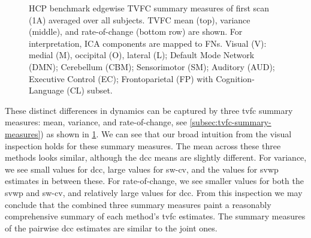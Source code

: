 \begin{figure}[t]
  \caption{
    HCP benchmark edgewise TVFC summary measures of first scan (1A) averaged over all subjects.
    TVFC mean (top), variance (middle), and rate-of-change (bottom row) are shown.
    For interpretation, ICA components are mapped to FNs.
    Visual (V): medial (M), occipital (O), lateral (L); Default Mode Network (DMN); Cerebellum (CBM); Sensorimotor (SM); Auditory (AUD); Executive Control (EC); Frontoparietal (FP) with Cognition-Language (CL) subset.
  }
  \label{fig:HCP-model-estimates-summary-measures}
\end{figure}


These distinct differences in dynamics can be captured by three \gls{tvfc} summary measures: mean, variance, and rate-of-change, see \cref{subsec:tvfc-summary-measures}) as shown in \cref{fig:HCP-model-estimates-summary-measures}.
We can see that our broad intuition from the visual inspection holds for these summary measures.
%
The mean across these three methods looks similar, although the \gls{dcc} means are slightly different.
%
For variance, we see small values for \gls{dcc}, large values for \gls{sw-cv}, and the values for \gls{svwp} estimates in between these.
%
For rate-of-change, we see smaller values for both the \gls{svwp} and \gls{sw-cv}, and relatively large values for \gls{dcc}.
%
From this inspection we may conclude that the combined three summary measures paint a reasonably comprehensive summary of each method's \gls{tvfc} estimates.
The summary measures of the pairwise \gls{dcc} estimates are similar to the joint ones.


